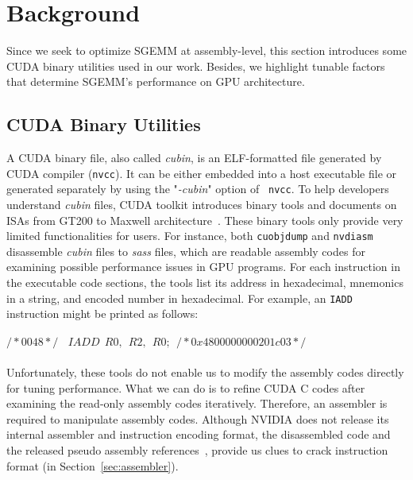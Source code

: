 \section{Background}
\label{sec:background}
Since we seek to optimize SGEMM at assembly-level, this section introduces some CUDA binary utilities used in our work. 
Besides, we highlight tunable factors that determine SGEMM's performance on GPU architecture.

\subsection{CUDA Binary Utilities}
\label{sec:cuda}

A CUDA binary file, also called {\em cubin}, is an ELF-formatted file generated by CUDA compiler ({\tt nvcc}). It can 
be either embedded into a host executable file or generated separately by using the "{\em -cubin}" option of {\tt 
nvcc}. To help developers understand {\em cubin} files, CUDA toolkit introduces binary tools and documents on ISAs from 
GT200 to Maxwell architecture~\cite{gtx980}. These binary tools only provide very limited functionalities for users. 
For instance, both {\tt cuobjdump} and {\tt nvdiasm} disassemble {\em cubin} files to {\em sass} files, which are 
readable assembly codes for examining possible performance issues in GPU programs. For each instruction in the 
executable code sections, the tools list its address in hexadecimal, mnemonics in a string, and encoded number in 
hexadecimal. For example, an {\tt IADD} instruction might be printed as follows: \\\\
$/*0048*/~~~~IADD~~R0,~~R2,~~R0;~~/* 0x4800000000201c03 */$\\\\
Unfortunately, these tools do not enable us to modify the assembly codes directly for tuning performance. What we can 
do is to refine CUDA C codes after examining the read-only assembly codes iteratively. Therefore, an assembler is 
required to manipulate assembly codes. Although NVIDIA does not release its internal assembler and instruction encoding 
format, the disassembled code and the released pseudo assembly references~\cite{ptx2015isa}, provide us clues to crack 
instruction format (in Section~\ref{sec:assembler}).

